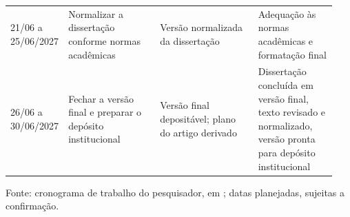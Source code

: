 \begin{landscape}
\begin{longtable}{p{0.12\linewidth}p{0.28\linewidth}p{0.30\linewidth}p{0.24\linewidth}}
21/06 a 25/06/2027 & Normalizar a dissertação conforme normas acadêmicas & Versão normalizada da dissertação & Adequação às normas acadêmicas e formatação final \\
26/06 a 30/06/2027 & Fechar a versão final e preparar o depósito institucional & Versão final depositável; plano do artigo derivado & Dissertação concluída em versão final, texto revisado e normalizado, versão pronta para depósito institucional \\
\end{longtable}
\noindent Fonte: cronograma de trabalho do pesquisador, em ; datas planejadas, sujeitas a confirmação.
\endgroup
\end{landscape}
